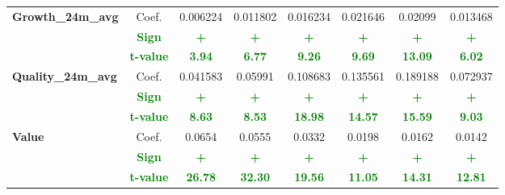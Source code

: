 \documentclass[11pt,english,a4paper,hidelinks]{book}
\begin{document}
\begin{table}[H]
\begin{tabular}{lccccccc}
        \midrule
        \multirow{3}{*}{\textbf{Growth\_24m\_avg}}
            & Coef.   & 0.006224  & 0.011802  & 0.016234  & 0.021646  & 0.02099   & 0.013468  \\
            & \textbf{\textcolor{green}{Sign}}
                     & \textbf{\textcolor{green}{+}}
                     & \textbf{\textcolor{green}{+}}
                     & \textbf{\textcolor{green}{+}}
                     & \textbf{\textcolor{green}{+}}
                     & \textbf{\textcolor{green}{+}}
                     & \textbf{\textcolor{green}{+}} \\
            & \textbf{\textcolor{green}{t-value}}
                     & \textbf{\textcolor{green}{3.94}}
                     & \textbf{\textcolor{green}{6.77}}
                     & \textbf{\textcolor{green}{9.26}}
                     & \textbf{\textcolor{green}{9.69}}
                     & \textbf{\textcolor{green}{13.09}}
                     & \textbf{\textcolor{green}{6.02}} \\
        \midrule
        \multirow{3}{*}{\textbf{Quality\_24m\_avg}}
            & Coef.   & 0.041583  & 0.05991   & 0.108683  & 0.135561  & 0.189188  & 0.072937  \\
            & \textbf{\textcolor{green}{Sign}}
                     & \textbf{\textcolor{green}{+}}
                     & \textbf{\textcolor{green}{+}}
                     & \textbf{\textcolor{green}{+}}
                     & \textbf{\textcolor{green}{+}}
                     & \textbf{\textcolor{green}{+}}
                     & \textbf{\textcolor{green}{+}} \\
            & \textbf{\textcolor{green}{t-value}}
                     & \textbf{\textcolor{green}{8.63}}
                     & \textbf{\textcolor{green}{8.53}}
                     & \textbf{\textcolor{green}{18.98}}
                     & \textbf{\textcolor{green}{14.57}}
                     & \textbf{\textcolor{green}{15.59}}
                     & \textbf{\textcolor{green}{9.03}} \\
        \midrule
        \multirow{3}{*}{\textbf{Value}} 
            & Coef.   & 0.0654  & 0.0555  & 0.0332  & 0.0198  & 0.0162  & 0.0142 \\
            & \textbf{\textcolor{green}{Sign}}    & \textbf{\textcolor{green}{+}}       & \textbf{\textcolor{green}{+}}       & \textbf{\textcolor{green}{+}}       & \textbf{\textcolor{green}{+}}       & \textbf{\textcolor{green}{+}}       & \textbf{\textcolor{green}{+}}      \\
            & \textbf{\textcolor{green}{t-value}} & \textbf{\textcolor{green}{26.78}}   & \textbf{\textcolor{green}{32.30}}   & \textbf{\textcolor{green}{19.56}}   & \textbf{\textcolor{green}{11.05}}   & \textbf{\textcolor{green}{14.31}}   & \textbf{\textcolor{green}{12.81}}  \\
        \bottomrule
    \end{tabular}
    \label{tab:third_linear_regression_results_scores}
\end{table}
\end{document}
